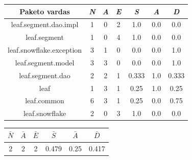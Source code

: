 
\begin{center}
    \begin{tabular}{|c|c|c|c|c|c|c|}
        \hline
        Paketo vardas & \textit{N} & \textit{A} & \textit{E} & \textit{S} & \textit{A} & \textit{D} \\ [0.5ex]
        \hline\hline
        leaf.segment.dao.impl & 1 & 0 & 2 & 1.0 & 0.0 & 0.0 \\
        \hline
        leaf.segment & 1 & 0 & 4 & 1.0 & 0.0 & 0.0 \\
        \hline
        leaf.snowflake.exception & 3 & 1 & 0 & 0.0 & 0.0 & 1.0 \\
        \hline
        leaf.segment.model & 3 & 3 & 0 & 0.0 & 0.0 & 1.0 \\
        \hline
        leaf.segment.dao & 2 & 2 & 1 & 0.333 & 1.0 & 0.333 \\
        \hline
        leaf & 1 & 3 & 1 & 0.25 & 1.0 & 0.25 \\
        \hline
        leaf.common & 6 & 3 & 1 & 0.25 & 0.0 & 0.75 \\
        \hline
        leaf.snowflake & 2 & 0 & 3 & 1.0 & 0.0 & 0.0 \\
        \hline
    \end{tabular}
    \begin{tabular}{|c|c|c|c|c|c|}
        \hline
        $\bar{N}$ & $\bar{A}$ & $\bar{E}$ & $\bar{S}$ & $\bar{A}$ & $\bar{D}$ \\ [0.5ex]
        \hline\hline
        2 & 2 & 2 & 0.479 & 0.25 & 0.417 \\
        \hline
    \end{tabular}
\end{center}
